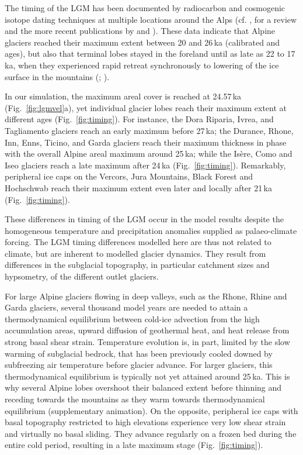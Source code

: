 \documentclass[tc, manuscript]{copernicus}
\begin{document}
    The timing of the LGM has been documented by radiocarbon and cosmogenic
    isotope dating techniques at multiple locations around the Alps (cf.
    \citealp[Fig.~5]{Wirsig.etal.2016}, for a review and the more recent
    publications by \citealp{Monegato.etal.2017} and
    \citealp{Federici.etal.2017}). These
    data indicate that Alpine glaciers reached their maximum extent between 20
    and 26\,ka (calibrated  and  ages), but also
    that terminal lobes stayed in the foreland until as late as 22 to 17\,ka,
    when they experienced rapid retreat synchronously to lowering of the ice
    surface in the mountains (\citealp[Fig.~5]{Wirsig.etal.2016};
    \citealp[Fig.~3]{Monegato.etal.2017}).

    In our simulation, the maximum areal cover is reached at 24.57\,ka
    (Fig.~\ref{fig:lgmvel}a), yet individual glacier lobes reach their
    maximum extent at different ages (Fig.~\ref{fig:timing}). For instance, the
    Dora Riparia, Ivrea, and Tagliamento glaciers reach an early maximum before
    27\,ka; the Durance, Rhone, Inn, Enns, Ticino, and Garda glaciers reach
    their maximum thickness in phase with the overall Alpine areal maximum
    around 25\,ka; while the Isère, Como and Iseo glaciers reach a late maximum
    after 24\,ka (Fig.~\ref{fig:timing}). Remarkably, peripheral ice caps on
    the Vercors, Jura Mountains, Black Forest and Hochschwab reach their
    maximum extent even later and locally after 21\,ka (Fig.~\ref{fig:timing}).

    These differences in timing of the LGM occur in the model results despite
    the homogeneous temperature and precipitation anomalies supplied as
    palaeo-climate forcing. The LGM timing differences modelled here are
    thus not related to climate, but are inherent to modelled glacier dynamics.
    They result from differences in the subglacial topography, in particular
    catchment sizes and hypsometry, of the different outlet glaciers.

    For large Alpine glaciers flowing in deep valleys, such as the Rhone,
    Rhine and Garda glaciers, several thousand model years are needed to attain
    a thermodynamical equilibrium between cold-ice advection from the high
    accumulation areas, upward diffusion of geothermal heat, and heat release
    from strong basal shear strain. Temperature evolution is, in part, limited
    by the slow warming of subglacial bedrock, that has been previously cooled
    downed by subfreezing air temperature before glacier advance.
    For larger glaciers, this thermodynamical equilibrium is typically not yet
    attained around 25\,ka. This is why several Alpine lobes overshoot their
    balanced extent before thinning and receding towards the mountains as they
    warm towards thermodynamical equilibrium (supplementary animation). On the
    opposite, peripheral ice caps with basal topography restricted to high
    elevations experience very low shear strain and virtually no basal sliding.
    They advance regularly on a frozen bed during the entire cold period,
    resulting in a late maximum stage (Fig.~\ref{fig:timing}).
\end{document}
